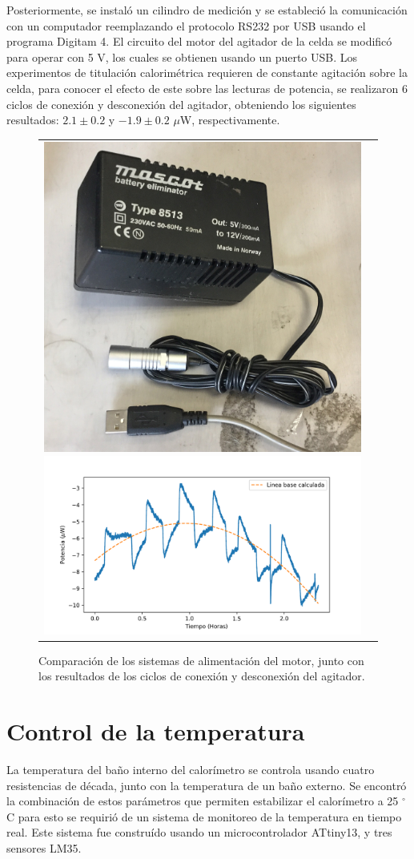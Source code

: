 \documentclass[a0]{sciposter}
\newcommand{\grad}{$^\circ$C}
\begin{document}
\begin{multicols}{3}
	Posteriormente, se instaló un cilindro de medición y se estableció la comunicación con un computador reemplazando el protocolo RS232 por USB usando el programa Digitam 4. El circuito del motor del agitador de la celda se modificó para operar con 5 V, los cuales se obtienen usando un puerto USB. Los experimentos de titulaci\'on calorim\'etrica requieren de constante agitaci\'on sobre la celda, para conocer el efecto de este sobre las lecturas de potencia, se realizaron 6 ciclos de conexi\'on y desconexi\'on del agitador, obteniendo los siguientes resultados: $2.1\pm0.2$ y $-1.9\pm0.2$ $\mu$W, respectivamente.
	\begin{figure}[h]
		\centering
		\begin{tabular}{cc}
			\includegraphics[width=0.3\linewidth]{../Tesis/Figures/motorCircuit}
			\includegraphics[width=0.7\linewidth]{../Data/Baselines/motor}
		\end{tabular}
		\caption{Comparación de los sistemas de alimentación del motor, junto con los resultados de los ciclos de conexión y desconexión del agitador.}
	\end{figure}

\section{Control de la temperatura}
	La temperatura del baño interno del calorímetro se controla usando cuatro resistencias de década, junto con la temperatura de un baño externo. Se encontr\'o la combinación de estos parámetros que permiten estabilizar el calorímetro a 25 \grad{} para esto se requirió de un sistema de monitoreo de la temperatura en tiempo real. Este sistema fue construído usando un microcontrolador ATtiny13, y tres sensores LM35.


\end{multicols}
\end{document}
